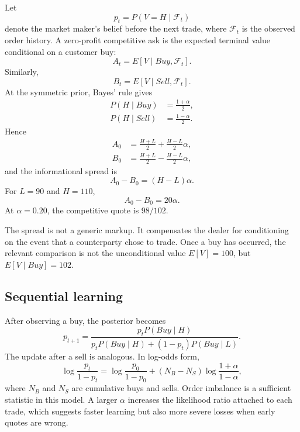 \documentclass[11pt]{article}
\begin{document}
Let
\begin{equation}
p_t=P(V=H\mid\mathcal{F}_t)
\end{equation}
denote the market maker's belief before the next trade, where $\mathcal{F}_t$ is the observed order history. A zero-profit competitive ask is the expected terminal value conditional on a customer buy:
\begin{equation}
A_t=E[V\mid Buy,\mathcal{F}_t].
\end{equation}
Similarly,
\begin{equation}
B_t=E[V\mid Sell,\mathcal{F}_t].
\end{equation}
At the symmetric prior, Bayes' rule gives
\begin{align}
P(H\mid Buy)&=\frac{1+\alpha}{2}, \\
P(H\mid Sell)&=\frac{1-\alpha}{2}.
\end{align}
Hence
\begin{align}
A_0 &= \frac{H+L}{2}+\frac{H-L}{2}\alpha, \\
B_0 &= \frac{H+L}{2}-\frac{H-L}{2}\alpha,
\end{align}
and the informational spread is
\begin{equation}
\boxed{A_0-B_0=(H-L)\alpha.}
\end{equation}
For $L=90$ and $H=110$,
\begin{equation}
A_0-B_0=20\alpha.
\end{equation}
At $\alpha=0.20$, the competitive quote is $98/102$.

The spread is not a generic markup. It compensates the dealer for conditioning on the event that a counterparty chose to trade. Once a buy has occurred, the relevant comparison is not the unconditional value $E[V]=100$, but $E[V\mid Buy]=102$.

\subsection{Sequential learning}

After observing a buy, the posterior becomes
\begin{equation}
p_{t+1}
=
\frac{p_t P(Buy\mid H)}
{p_tP(Buy\mid H)+(1-p_t)P(Buy\mid L)}.
\end{equation}
The update after a sell is analogous. In log-odds form,
\begin{equation}
\log\frac{p_t}{1-p_t}
=
\log\frac{p_0}{1-p_0}
+(N_B-N_S)
\log\frac{1+\alpha}{1-\alpha},
\end{equation}
where $N_B$ and $N_S$ are cumulative buys and sells. Order imbalance is a sufficient statistic in this model. A larger $\alpha$ increases the likelihood ratio attached to each trade, which suggests faster learning but also more severe losses when early quotes are wrong.
\end{document}
